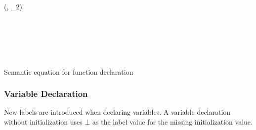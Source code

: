 \begin{table}[H]
\begin{semanticequations}
{(\icstr, \ienvF_2)}{
   \\
   \\
   \\
   \\
   \\
   \\
}
\end{semanticequations}
\caption{Semantic equation for function declaration}
\label{cstr:functiondeclaration}
\end{table}

\subsubsection{Variable Declaration}
New labels are introduced when declaring variables.
A variable declaration without initialization uses $\bot$ as the label value for the missing initialization value.

